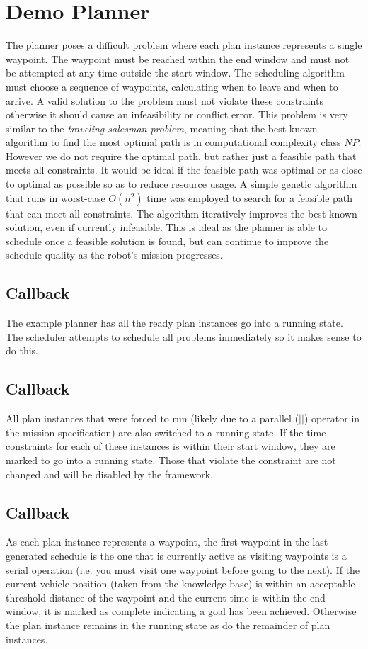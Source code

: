 \section{Demo  Planner}
The  planner poses a difficult problem where each plan instance represents a single waypoint. The waypoint must be reached within the end window and must not be attempted at any time outside the start window. The scheduling algorithm must choose a sequence of waypoints, calculating when to leave and when to arrive. A valid solution to the problem must not violate these constraints otherwise it should cause an infeasibility or conflict error. This problem is very similar to the \emph{traveling salesman problem}, meaning that the best known algorithm to find the most optimal path is in computational complexity class $NP$. However we do not require the optimal path, but rather just a feasible path that meets all constraints. It would be ideal if the feasible path was optimal or as close to optimal as possible so as to reduce resource usage. A simple genetic algorithm that runs in worst-case $O(n^2)$ time was employed to search for a feasible path that can meet all constraints. The algorithm iteratively improves the best known solution, even if currently infeasible. This is ideal as the planner is able to schedule once a feasible solution is found, but can continue to improve the schedule quality as the robot's mission progresses.

\subsection{Callback } 
The example planner has all the ready plan instances go into a running state. The scheduler attempts to schedule all problems immediately so it makes sense to do this.

\subsection{Callback }
All plan instances that were forced to run (likely due to a parallel ($||$) operator in the mission specification) are also switched to a running state. If the time constraints for each of these instances is within their start window, they are marked to go into a running state. Those that violate the constraint are not changed and will be disabled by the framework. 

\subsection{Callback }
As each plan instance represents a waypoint, the first waypoint in the last generated schedule is the one that is currently active as visiting waypoints is a serial operation (i.e. you must visit one waypoint before going to the next). If the current vehicle position (taken from the knowledge base) is within an acceptable threshold distance of the waypoint and the current time is within the end window, it is marked as complete indicating a goal has been achieved. Otherwise the plan instance remains in the running state as do the remainder of plan instances.

